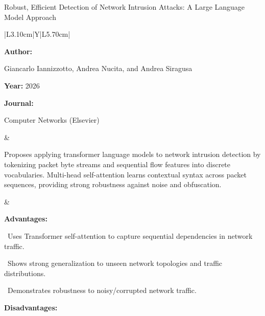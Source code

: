 \begin{frame}[t]{Robust, Efficient Detection of Network Intrusion Attacks: A Large Language Model Approach}
\vspace{-0.30em}
{\footnotesize\setlength{\tabcolsep}{3.5pt}\renewcommand{\arraystretch}{1.10}
\begin{tabularx}{\textwidth}{|L{3.10cm}|Y|L{5.70cm}|}
\hline\lrhdr\hline
\begin{minipage}[t]{\linewidth}\fontsize{7.2pt}{9.2pt}\raggedright\selectfont
\textbf{Author:}\par
Giancarlo Iannizzotto, Andrea Nucita, and Andrea Siragusa\par\vspace{4pt}
\textbf{Year:} 2026\par\vspace{4pt}
\textbf{Journal:}\par
Computer Networks (Elsevier)\par\vspace{4pt}
\end{minipage}
&
\begin{minipage}[t]{\linewidth}\fontsize{7.2pt}{9.2pt}\raggedright\selectfont
Proposes applying transformer language models to network intrusion detection by tokenizing packet byte streams and sequential flow features into discrete vocabularies. Multi-head self-attention learns contextual syntax across packet sequences, providing strong robustness against noise and obfuscation.\par\vspace{4pt}
\end{minipage}
&
\begin{minipage}[t]{\linewidth}\fontsize{6.7pt}{8.2pt}\raggedright\selectfont
\textcolor{strengthGreen}{\textbf{Advantages:}}\par\vspace{1.3pt}
\textbullet~Uses Transformer self-attention to capture sequential dependencies in network traffic.\par\vspace{1.8pt}\textbullet~Shows strong generalization to unseen network topologies and traffic distributions.\par\vspace{1.8pt}\textbullet~Demonstrates robustness to noisy/corrupted network traffic.\par\vspace{3.2pt}
\textcolor{limitRed}{\textbf{Disadvantages:}}\par\vspace{1.3pt}

\end{minipage}
\end{tabularx}}
\end{frame}
